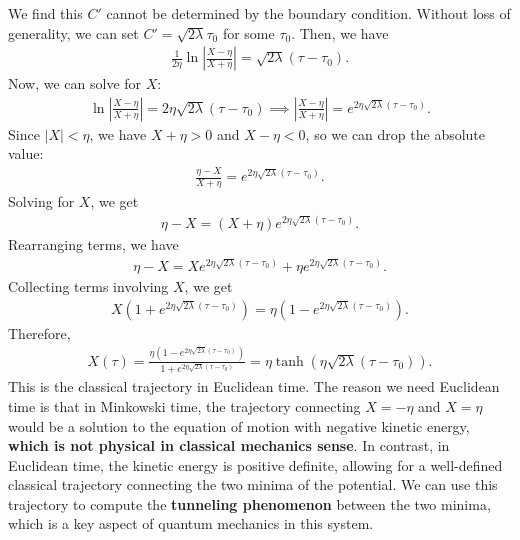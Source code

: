 We find this $C'$ cannot be determined by the boundary condition. Without loss of generality, we can set $C'=\sqrt{2\lambda}\tau_0$ for some $\tau_0$. Then, we have
\begin{align}
    \frac{1}{2\eta} \ln \left| \frac{X-\eta}{X+\eta} \right| = \sqrt{2\lambda} (\tau - \tau_0).
\end{align}
Now, we can solve for $X$:
\begin{align}
    \ln \left| \frac{X-\eta}{X+\eta} \right| = 2\eta \sqrt{2\lambda} (\tau - \tau_0) \implies \left| \frac{X-\eta}{X+\eta} \right| = e^{2\eta \sqrt{2\lambda} (\tau - \tau_0)}.
\end{align}
Since $|X| < \eta$, we have $X + \eta > 0$ and $X - \eta < 0$, so we can drop the absolute value:
\begin{align}
    \frac{\eta - X}{X + \eta} = e^{2\eta \sqrt{2\lambda} (\tau - \tau_0)}.
\end{align}
Solving for $X$, we get
\begin{align}
    \eta - X = (X + \eta) e^{2\eta \sqrt{2\lambda} (\tau - \tau_0)}.
\end{align}
Rearranging terms, we have
\begin{align}
    \eta - X = X e^{2\eta \sqrt{2\lambda} (\tau - \tau_0)} + \eta e^{2\eta \sqrt{2\lambda} (\tau - \tau_0)}.
\end{align}
Collecting terms involving $X$, we get
\begin{align}
    X (1 + e^{2\eta \sqrt{2\lambda} (\tau - \tau_0)}) = \eta (1 - e^{2\eta \sqrt{2\lambda} (\tau - \tau_0)}).
\end{align}
Therefore,
\begin{align}
    X(\tau) = \frac{\eta (1 - e^{2\eta \sqrt{2\lambda} (\tau - \tau_0)})}{1 + e^{2\eta \sqrt{2\lambda} (\tau - \tau_0)}} = \eta \tanh (\eta \sqrt{2\lambda} (\tau - \tau_0)).
\end{align}
This is the classical trajectory in Euclidean time. The reason we need Euclidean time is that in Minkowski time, the trajectory connecting $X=-\eta$ and $X=\eta$ would be a solution to the equation of motion with negative kinetic energy, \textbf{which is not physical in classical mechanics sense}. In contrast, in Euclidean time, the kinetic energy is positive definite, allowing for a well-defined classical trajectory connecting the two minima of the potential. We can use this trajectory to compute the \textbf{tunneling phenomenon} between the two minima, which is a key aspect of quantum mechanics in this system.